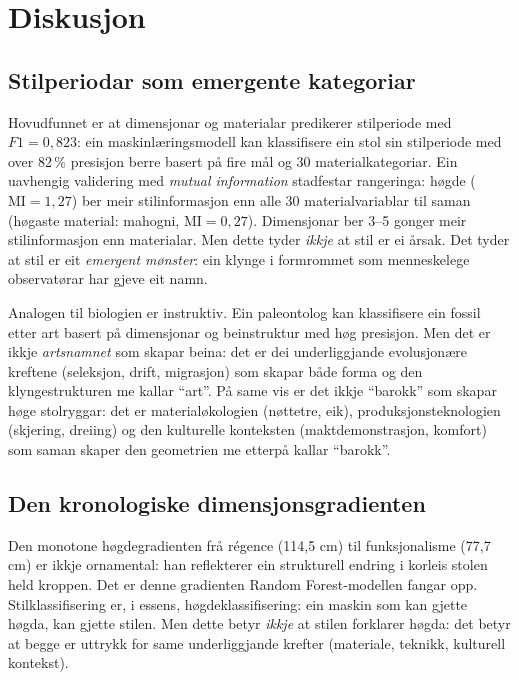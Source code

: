 \documentclass[10pt, a4paper, twocolumn]{article}
\begin{document}
\section{Diskusjon}

\subsection{Stilperiodar som emergente kategoriar}

Hovudfunnet er at dimensjonar og materialar predikerer stilperiode med $F1 = 0{,}823$: ein maskinlæringsmodell kan klassifisere ein stol sin stilperiode med over 82\,\% presisjon berre basert på fire mål og 30 materialkategoriar. Ein uavhengig validering med \emph{mutual information} stadfestar rangeringa: høgde ($\text{MI} = 1{,}27$) ber meir stilinformasjon enn alle 30 materialvariablar til saman (høgaste material: mahogni, $\text{MI} = 0{,}27$). Dimensjonar ber 3--5 gonger meir stilinformasjon enn materialar. Men dette tyder \emph{ikkje} at stil er ei årsak. Det tyder at stil er eit \emph{emergent mønster}: ein klynge i formrommet som menneskelege observatørar har gjeve eit namn.

Analogen til biologien er instruktiv. Ein paleontolog kan klassifisere ein fossil etter art basert på dimensjonar og beinstruktur med høg presisjon. Men det er ikkje \emph{artsnamnet} som skapar beina: det er dei underliggjande evolusjonære kreftene (seleksjon, drift, migrasjon) som skapar både forma og den klyngestrukturen me kallar ``art''. På same vis er det ikkje ``barokk'' som skapar høge stolryggar: det er materialøkologien (nøttetre, eik), produksjonsteknologien (skjering, dreiing) og den kulturelle konteksten (maktdemonstrasjon, komfort) som saman skaper den geometrien me etterpå kallar ``barokk''.

\subsection{Den kronologiske dimensjonsgradienten}

Den monotone høgdegradienten frå régence (114,5 cm) til funksjonalisme (77,7 cm) er ikkje ornamental: han reflekterer ein strukturell endring i korleis stolen held kroppen. Det er denne gradienten Random Forest-modellen fangar opp. Stilklassifisering er, i essens, høgdeklassifisering: ein maskin som kan gjette høgda, kan gjette stilen. Men dette betyr \emph{ikkje} at stilen forklarer høgda: det betyr at begge er uttrykk for same underliggjande krefter (materiale, teknikk, kulturell kontekst).
\end{document}
